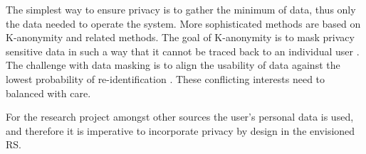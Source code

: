 The simplest way to ensure privacy is to gather the minimum of data, thus only the data needed to operate the system. 
More sophisticated methods are based on K-anonymity and related methods. 
The goal of K-anonymity is to mask privacy sensitive data in such a way that it cannot be traced back to an individual user \cite{sweeney2002k}. 
The challenge with data masking is to align the usability of data against the lowest probability of re-identification \cite{d2015privacy}. 
These conflicting interests need to balanced with care.

For the research project amongst other sources the user's personal data is used, and therefore it is imperative to incorporate privacy by design in the envisioned RS. 


